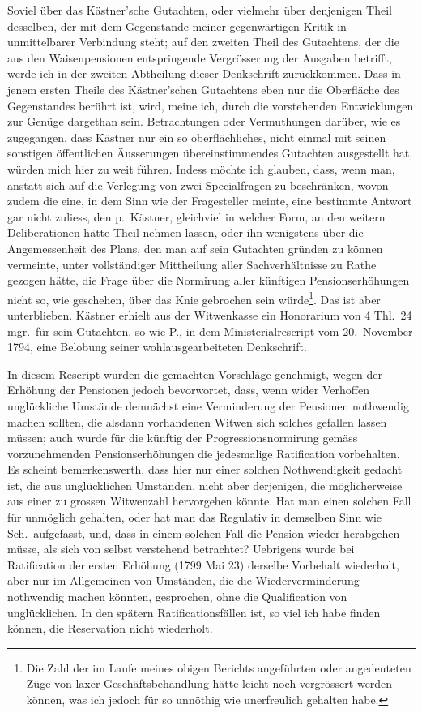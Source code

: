 \documentclass[12pt,a4paper]{article}
\begin{document}
Soviel \"uber das K\"astner'sche Gutachten, oder vielmehr \"uber denjenigen Theil desselben, der mit dem Gegenstande meiner gegenw\"artigen Kritik in unmittelbarer Verbindung steht; auf den zweiten Theil des Gutachtens, der die aus den Waisenpensionen entspringende Vergr\"osserung der Ausgaben betrifft, werde ich in der zweiten Abtheilung dieser Denkschrift zur\"uckkommen. Dass in jenem ersten Theile des K\"astner'schen Gutachtens eben nur die Oberfl\"ache des Gegenstandes ber\"uhrt ist, wird, meine ich, durch die vorstehenden Entwicklungen zur Gen\"uge dargethan sein. Betrachtungen oder Vermuthungen dar\"uber, wie es zugegangen, dass K\"astner nur ein so oberfl\"achliches, nicht einmal mit seinen sonstigen \"offentlichen \"Ausserungen \"ubereinstimmendes Gutachten ausgestellt hat, w\"urden mich hier zu weit f\"uhren. Indess m\"ochte ich glauben, dass, wenn man, anstatt sich auf die Verlegung von zwei Specialfragen zu beschr\"anken, wovon zudem die eine, in dem Sinn wie der Fragesteller meinte, eine bestimmte Antwort gar nicht zuliess, den p.\ K\"astner, gleichviel in welcher Form, an den weitern Deliberationen h\"atte Theil nehmen lassen, oder ihn wenigstens \"uber die Angemessenheit des Plans, den man auf sein Gutachten gr\"unden zu k\"onnen vermeinte, unter vollst\"andiger Mittheilung aller Sachverh\"altnisse zu Rathe gezogen h\"atte, die Frage \"uber die Normirung aller k\"unftigen Pensionserh\"ohungen nicht so, wie geschehen, \"uber das Knie gebrochen sein w\"urde\footnote{Die Zahl der im Laufe meines obigen Berichts angef\"uhrten oder angedeuteten Z\"uge von laxer Gesch\"aftsbehandlung h\"atte leicht noch vergr\"ossert werden k\"onnen, was ich jedoch f\"ur so unn\"othig wie unerfreulich gehalten habe.}. Das ist aber unterblieben. K\"astner erhielt aus der Witwenkasse ein Honorarium von 4 Thl.\ 24 mgr.\ f\"ur sein Gutachten, so wie P., in dem Ministerialrescript vom 20.\ November 1794, eine Belobung seiner wohlausgearbeiteten Denkschrift.

In diesem Rescript wurden die gemachten Vorschl\"age genehmigt, wegen der Erh\"ohung der Pensionen jedoch bevorwortet, dass, wenn wider Verhoffen ungl\"uckliche Umst\"ande demn\"achst eine Verminderung der Pensionen nothwendig machen sollten, die alsdann vorhandenen Witwen sich solches gefallen lassen m\"ussen; auch wurde f\"ur die k\"unftig der Progressionsnormirung gem\"ass vorzunehmenden Pensionserh\"ohungen die jedesmalige Ratification vorbehalten. Es scheint bemerkenswerth, dass hier nur einer solchen Nothwendigkeit gedacht ist, die aus ungl\"ucklichen Umst\"anden, nicht aber derjenigen, die m\"oglicherweise aus einer zu grossen Witwenzahl hervorgehen k\"onnte. Hat man einen solchen Fall f\"ur unm\"oglich gehalten, oder hat man das Regulativ in demselben Sinn wie Sch.\ aufgefasst, und, dass in einem solchen Fall die Pension wieder herabgehen m\"usse, als sich von selbst verstehend betrachtet? Uebrigens wurde bei Ratification der ersten Erh\"ohung (1799 Mai 23) derselbe Vorbehalt wiederholt, aber nur im Allgemeinen von Umst\"anden, die die Wiederverminderung nothwendig machen k\"onnten, gesprochen, ohne die Qualification von ungl\"ucklichen. In den sp\"atern Ratificationsf\"allen ist, so viel ich habe finden k\"onnen, die Reservation nicht wiederholt.
\end{document}
